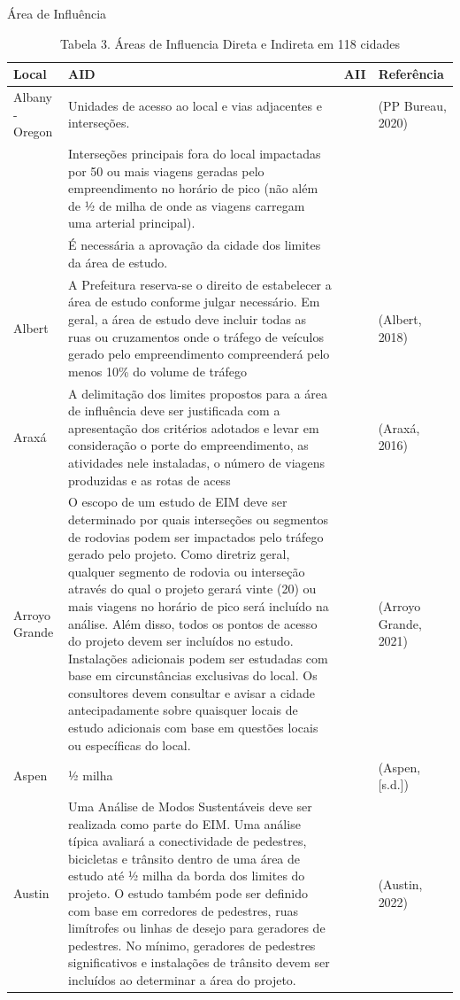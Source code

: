 \documentclass[]{article}
\begin{document}
{ Área de Influência }

\begin{table}

\caption{\label{tab:unnamed-chunk-4}Tabela 3. Áreas de Influencia Direta e Indireta em 118 cidades}
\centering
\begin{tabular}[t]{l|l|l|l}
\hline
Local & AID & AII & Referência\\
\hline
Albany - Oregon & Unidades de acesso ao local e vias adjacentes e interseções. &  & (PP Bureau, 2020)\\
\hline
 & Interseções principais fora do local impactadas por 50 ou mais viagens geradas pelo empreendimento no horário de pico (não além de ½ de milha de onde as viagens carregam uma arterial principal). &  & \\
\hline
 & É necessária a aprovação da cidade dos limites da área de estudo. &  & \\
\hline
Albert & A Prefeitura reserva-se o direito de estabelecer a área de estudo conforme julgar necessário. Em geral, a área de estudo deve incluir todas as ruas ou cruzamentos onde o tráfego de veículos gerado pelo empreendimento compreenderá pelo menos 10\% do volume de tráfego &  & (Albert, 2018)\\
\hline
Araxá & A delimitação dos limites propostos para a área de influência deve ser justificada com a apresentação dos critérios adotados e levar em consideração o porte do empreendimento, as atividades nele instaladas, o número de viagens produzidas e as rotas de acess &  & (Araxá, 2016)\\
\hline
Arroyo Grande & O escopo de um estudo de EIM deve ser determinado por quais interseções ou segmentos de rodovias podem ser impactados pelo tráfego gerado pelo projeto. Como diretriz geral, qualquer segmento de rodovia ou interseção através do qual o projeto gerará vinte (20) ou mais viagens no horário de pico será incluído na análise. Além disso, todos os pontos de acesso do projeto devem ser incluídos no estudo. Instalações adicionais podem ser estudadas com base em circunstâncias exclusivas do local. Os consultores devem consultar e avisar a cidade antecipadamente sobre quaisquer locais de estudo adicionais com base em questões locais ou específicas do local. &  & (Arroyo Grande, 2021)\\
\hline
Aspen & ½ milha &  & (Aspen, [s.d.])\\
\hline
Austin & Uma Análise de Modos Sustentáveis deve ser realizada como parte do EIM. Uma análise típica avaliará a conectividade de pedestres, bicicletas e trânsito dentro de uma área de estudo até ½ milha da borda dos limites do projeto. O estudo também pode ser definido com base em corredores de pedestres, ruas limítrofes ou linhas de desejo para geradores de pedestres. No mínimo, geradores de pedestres significativos e instalações de trânsito devem ser incluídos ao determinar a área do projeto. &  & (Austin, 2022)\\

\end{tabular}
\end{table}
\end{document}
